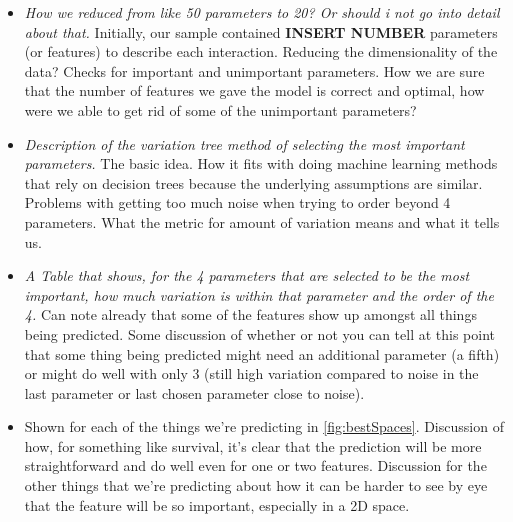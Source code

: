 \documentclass[fleqn,usenatbib]{mnras}
\begin{document}
\begin{itemize}
    \item \textit{How we reduced from like 50 parameters to 20? Or should i not go into detail about that.} Initially, our sample contained \textbf{INSERT NUMBER} parameters (or features) to describe each interaction. Reducing the dimensionality of the data? Checks for important and unimportant parameters. How we are sure that the number of features we gave the model is correct and optimal, how were we able to get rid of some of the unimportant parameters?
    \item \textit{Description of the variation tree method of selecting the most important parameters.} The basic idea. How it fits with doing machine learning methods that rely on decision trees because the underlying assumptions are similar. Problems with getting too much noise when trying to order beyond 4 parameters. What the metric for amount of variation means and what it tells us.
    \item \textit{A Table that shows, for the 4 parameters that are selected to be the most important, how much variation is within that parameter and the order of the 4.} Can note already that some of the features show up amongst all things being predicted. Some discussion of whether or not you can tell at this point that some thing being predicted might need an additional parameter (a fifth) or might do well with only 3 (still high variation compared to noise in the last parameter or last chosen parameter close to noise).
    \item {} Shown for each of the things we're predicting in \ref{fig:bestSpaces}. Discussion of how, for something like survival, it's clear that the prediction will be more straightforward and do well even for one or two features. Discussion for the other things that we're predicting about how it can be harder to see by eye that the feature will be so important, especially in a 2D space.
\end{itemize}
\end{document}
